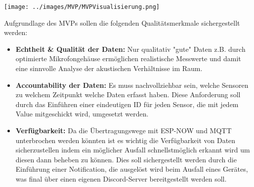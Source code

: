 \begin{center}
  \texttt{[image: ../images/MVP/MVPVisualisierung.png]}
\end{center}

Aufgrundlage des MVPs sollen die folgenden Qualitätsmerkmale sichergestellt werden:
\begin{itemize}
    \item \textbf{Echtheit \& Qualität der Daten:}
    Nur qualitativ "gute" Daten z.B. durch optimierte Mikrofongehäuse ermöglichen realistische Messwerte und damit eine sinnvolle Analyse der akustischen Verhältnisse im Raum.
\item \textbf{Accountability der Daten:}
    Es muss nachvollziehbar sein, welche Sensoren zu welchem Zeitpunkt welche Daten erfasst haben. Diese Anforderung soll durch das Einführen einer eindeutigen ID für jeden Sensor, die mit jedem Value mitgeschickt wird, umgesetzt werden.
    \item \textbf{Verfügbarkeit:}
    Da die Übertragungswege mit ESP-NOW und MQTT unterbrochen werden könnten ist es wichtig die Verfügbarkeit von Daten sicherzustellen indem ein möglicher Ausfall schnellstmöglich erkannt wird um diesen dann beheben zu können. Dies soll sichergestellt werden durch die Einführung einer Notification, die ausgelöst wird beim Ausfall eines Gerätes, was final über einen eigenen Discord-Server bereitgestellt werden soll.
\end{itemize}
